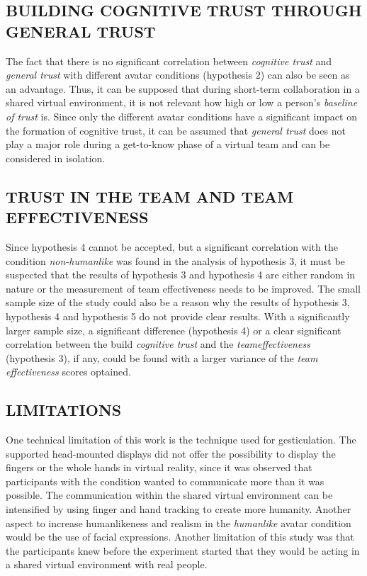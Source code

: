 \documentclass[sigchi]{acmart}
\begin{document}
\subsection{BUILDING COGNITIVE TRUST THROUGH GENERAL TRUST}
The fact that there is no significant correlation between \textit{cognitive trust} and \textit{general trust} with different avatar conditions (hypothesis 2) can also be seen as an advantage.
Thus, it can be supposed that during short-term collaboration in a shared virtual environment, it is not relevant how high or low a person's \textit{baseline of trust} is. 
Since only the different avatar conditions have a significant impact on the formation of cognitive trust, it can be assumed that \textit{general trust} does not play a major role during a get-to-know phase of a virtual team and can be considered in isolation.

\subsection{TRUST IN THE TEAM AND TEAM EFFECTIVENESS}
Since hypothesis 4 cannot be accepted, but a significant correlation with the condition \textit{non-humanlike} was found in the analysis of hypothesis 3, it must be suspected that the results of hypothesis 3 and hypothesis 4 are either random in nature or the measurement of team effectiveness needs to be improved.
The small sample size of the study could also be a reason why the results of hypothesis 3, hypothesis 4 and hypothesis 5 do not provide clear results. With a significantly larger sample size, a significant difference (hypothesis 4) or a clear significant correlation between the build \textit{cognitive trust} and the \textit{teameffectiveness} (hypothesis 3), if any, could be found with a larger variance of the \textit{team effectiveness} scores optained.

\subsection{LIMITATIONS}
One technical limitation of this work is the technique used for gesticulation. The supported head-mounted displays did not offer the possibility to display the fingers or the whole hands in virtual reality, since it was observed that participants with the condition  wanted to communicate more than it was possible. The communication within the shared virtual environment can be intensified by using finger and hand tracking to create more humanity. Another aspect to increase humanlikeness and realism in the \textit{humanlike} avatar condition would be the use of facial expressions.
Another limitation of this study was that the participants knew before the experiment started that they would be acting in a shared virtual environment with real people.
\end{document}
